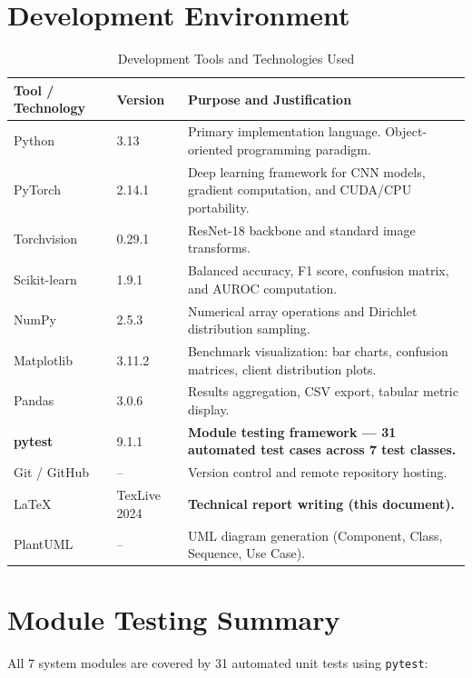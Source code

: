 \documentclass[12pt,a4paper]{report}
\begin{document}
\section{Development Environment}
\begin{table}[H]
    \centering
    \caption{Development Tools and Technologies Used}
    \label{tab:tools}
    \begin{tabular}{|p{3.5cm}|p{3.5cm}|p{7cm}|}
        \hline
        \textbf{Tool / Technology} & \textbf{Version} & \textbf{Purpose and Justification} \\
        \hline
        Python & 3.13 & Primary implementation language. Object-oriented programming paradigm. \\
        \hline
        PyTorch & 2.14.1 & Deep learning framework for CNN models, gradient computation, and CUDA/CPU portability. \\
        \hline
        Torchvision & 0.29.1 & ResNet-18 backbone and standard image transforms. \\
        \hline
        Scikit-learn & 1.9.1 & Balanced accuracy, F1 score, confusion matrix, and AUROC computation. \\
        \hline
        NumPy & 2.5.3 & Numerical array operations and Dirichlet distribution sampling. \\
        \hline
        Matplotlib & 3.11.2 & Benchmark visualization: bar charts, confusion matrices, client distribution plots. \\
        \hline
        Pandas & 3.0.6 & Results aggregation, CSV export, tabular metric display. \\
        \hline
        \textbf{pytest} & 9.1.1 & \textbf{Module testing framework — 31 automated test cases across 7 test classes.} \\
        \hline
        Git / GitHub & -- & Version control and remote repository hosting. \\
        \hline
        \LaTeX{} & TexLive 2024 & \textbf{Technical report writing (this document).} \\
        \hline
        PlantUML & -- & UML diagram generation (Component, Class, Sequence, Use Case). \\
        \hline
    \end{tabular}
\end{table}

\section{Module Testing Summary}
All 7 system modules are covered by 31 automated unit tests using \texttt{pytest}:
\end{document}
